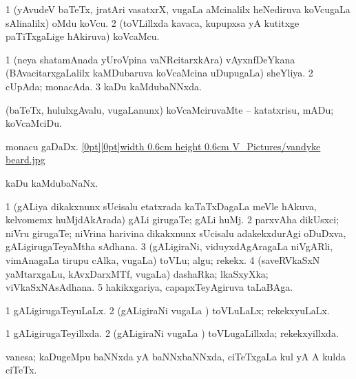 \bentry
{} 
\gl{\nA}
\expl{}
\bmng
\bnum
\num{1} (yAvudeV baTeTx, jratAri vasatxrX, \mo vugaLa aMcinalilx heNediruva koVcugaLa sAlinalilx) oMdu koVcu. 
\num{2} (toVLillxda kavaca, kupupxsa yA kutitxge paTiTxgaLige hAkiruva) koVcaMcu. 
\enum
\emng
\eentry

\bentry
{} 
\gl{\gu}
\expl{}
\bmng
\bnum
\num{1} (neya shatamAnada yUroVpina vaNRcitarxkAra) vAyxnfDeYkana (BAvacitarxgaLalilx kaMDubaruva koVcaMcina uDupugaLa) sheYliya. 
\num{2} cUpAda; monacAda. 
\num{3} kaDu kaMdubaNNxda. 
\enum
\emng
\eentry

\bentry
{} 
\gl{\sakirx}
\expl{}
\bmng
 (baTeTx, hululxgAvalu, \mo vugaLanunx) koVcaMciruvaMte -- katatxrisu, mADu; koVcaMciDu. 
\emng
\eentry

\bentry
{}
\gl{\nA}
\bmng
monacu gaDaDx. \quad \hyperlink{vandyke beardfigure}{\raisebox{-0.25cm}[0pt][0pt]{\pdfimage width 0.6cm height 0.6cm {V_Pictures/vandyke beard.jpg}}} 
\emng
\eentry

\bentry
{}
\gl{\nA}
\expl{}
\bmng
kaDu kaMdubaNaNx. 
\emng
\eentry

\bentry
{} 
\gl{\nA}
\expl{}
\bmng
\bnum
\num{1} (gALiya dikakxnunx sUcisalu etatxrada kaTaTxDagaLa meVle hAkuva, kelvomemx huMjdAkArada) gALi girugaTe; gALi huMj. 
\num{2} parxvAha dikUsxci; niVru girugaTe; niVrina harivina dikakxnunx sUcisalu adakekxdurAgi oDuDxva, gALigirugaTeyaMtha sAdhana. 
\num{3} (gALigiraNi, viduyxdAgAragaLa niVgARli, vimAnagaLa tirupu cAlka, \mo vugaLa) toVLu; algu; rekekx. 
\num{4} (saveRVkaSxN yaMtarxgaLu, kAvxDarxMTf, \mo vugaLa) dashaRka; lkaSxyXka; viVkaSxNAsAdhana. 
\num{5} hakikxgariya, capapxTeyAgiruva taLaBAga. 
\enum
\emng
\eentry

\bentry 
{} 
\gl{\gu}
\expl{}
\bmng
\bnum
\num{1} gALigirugaTeyuLaLx. 
\num{2} (gALigiraNi \mo vugaLa \vi) toVLuLaLx; rekekxyuLaLx. 
\enum
\emng
\eentry

\bentry
{} 
\gl{\gu}
\expl{}
\bmng
\bnum
\num{1} gALigirugaTeyillxda. 
\num{2} (gALigiraNi \mo vugaLa \vi) toVLugaLillxda; rekekxyillxda. 
\enum
\emng
\eentry

\bentry
{} 
\gl{\nA}
\expl{}
\bmng
 vanesa; kaDugeMpu baNNxda yA baNNxbaNNxda, ciTeTxgaLa kul yA A kulda ciTeTx. 
\emng
\eentry

